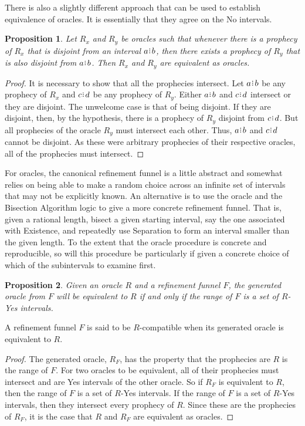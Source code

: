 \documentclass[12pt]{article}
\newtheorem{proposition}{Proposition}[section]
\begin{document}
There is also a slightly different approach that can be used to establish equivalence of oracles. It is essentially that they agree on the No intervals. 

\begin{proposition}
    Let $R_x$ and $R_y$ be oracles such that whenever there is a prophecy of $R_x$ that is disjoint from an interval $a\rint b$, then there exists a prophecy of $R_y$ that is also disjoint from $a\rint b$. Then $R_x$ and $R_y$ are equivalent as oracles. 
\end{proposition}

\begin{proof}
    It is necessary to show that all the prophecies intersect. Let $a\rint b$ be any prophecy of $R_x$ and $c\rint d$ be any prophecy of $R_y$. Either $a\rint b$ and $c\rint d$ intersect or they are disjoint. The unwelcome case is that of being disjoint. If they are disjoint, then, by the hypothesis, there is a prophecy of $R_y$ disjoint from $c\rint d$. But all prophecies of the oracle $R_y$ must intersect each other. Thus,  $a\rint b$ and $c\rint d$ cannot be disjoint. As these were arbitrary prophecies of their respective oracles, all of the prophecies must intersect. 
\end{proof}

For oracles, the canonical refinement funnel is a little abstract and somewhat relies on being able to make a random choice across an infinite set of intervals that may not be explicitly known. An alternative is to use the oracle and the Bisection Algorithm logic to give a more concrete refinement funnel. That is, given a rational length, bisect a given starting interval, say the one associated with Existence, and repeatedly use Separation to form an interval smaller than the given length. To the extent that the oracle procedure is concrete and reproducible, so will this procedure be particularly if given a concrete choice of which of the subintervals to examine first. 

\begin{proposition}
    Given an oracle $R$ and a refinement funnel $F$, the generated oracle from $F$ will be equivalent to $R$ if and only if the range of $F$ is a set of $R$-Yes intervals.
\end{proposition}

A refinement funnel $F$ is said to be $R$-compatible when its generated oracle is equivalent to $R$. 

\begin{proof}
    The generated oracle, $R_F$, has the property that the prophecies are $R$ is the range of $F$. For two oracles to be equivalent, all of their prophecies must intersect and are Yes intervals of the other oracle. So if $R_F$ is equivalent to $R$, then the range of $F$ is a set of $R$-Yes intervals. If the range of $F$ is a set of $R$-Yes intervals, then they intersect every prophecy of $R$. Since these are the prophecies of $R_F$, it is the case that $R$ and $R_F$ are equivalent as oracles. 
\end{proof}
\end{document}
